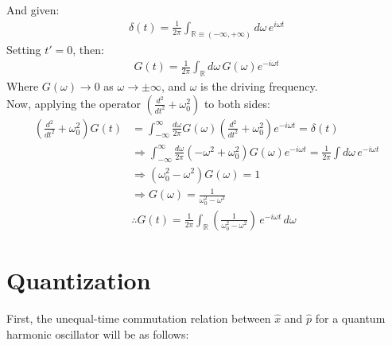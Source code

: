 \documentclass[14pt]{article} %
\begin{document}
{And given:
\begin{align*}
\delta(t) = \frac{1}{2\pi} \int_{\mathbb{R}\equiv(-\infty,+\infty)} d\omega \, e^{i\omega t}
\end{align*}
Setting $t' = 0$, then:
\begin{align*}
G(t) = \frac{1}{2\pi} \int_{\mathbb{R}} d\omega \, G(\omega) e^{-i\omega t}
\end{align*}
Where $G(\omega) \to 0$ as $\omega \to \pm \infty$, and $\omega$ is the driving frequency. \\

Now, applying the operator $\left( \frac{d^2}{dt^2} + \omega_0^2 \right)$ to both sides:
\begin{align*}
\left( \frac{d^2}{dt^2} + \omega_0^2 \right) G(t) &= \int_{-\infty}^{\infty} \frac{d\omega}{2\pi}G(\omega) \left( \frac{d^2}{dt^2}+\omega_0^2 \right) e^{-i\omega t}
= \delta(t) \\
&\Rightarrow \int_{-\infty}^{\infty} \frac{d\omega}{2\pi} \left( -\omega^2 + \omega_0^2 \right) G(\omega) e^{-i\omega t}
= \frac{1}{2\pi} \int d\omega \, e^{ -i \omega t } \\
& \Rightarrow 
\left( \omega_0^2 - \omega^2 \right) G(\omega) = 1 \\
& \Rightarrow G(\omega) = \frac{1}{\omega_0^2 - \omega^2} \\
& \therefore G(t) = \frac{1}{2\pi} \int_{\mathbb{R}} \left( \frac{1}{\omega_0^2 - \omega^2}\right) \, e^{-i\omega t} \, d\omega
\end{align*}





\section*{Quantization}
First, the unequal-time commutation relation between $\hat{x}$ and $\hat{p}$ for a quantum harmonic oscillator will be as follows:  

}
\end{document}
